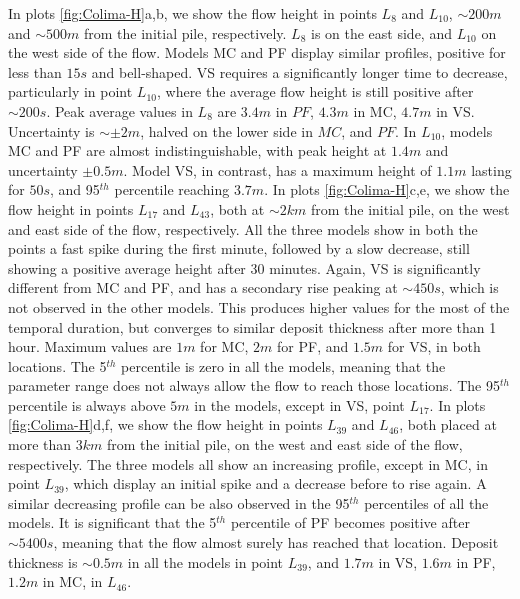 \documentclass{article}
\begin{document}
In plots \ref{fig:Colima-H}a,b, we show the flow height in points $L_8$ and $L_{10}$, $\sim 200 m$ and $\sim 500 m$ from the initial pile, respectively. $L_8$ is on the east side, and $L_{10}$ on the west side of the flow. Models MC and PF display similar profiles, positive for less than $15 s$ and bell-shaped. VS requires a significantly longer time to decrease, particularly in point $L_{10}$, where the average flow height is still positive after $\sim 200 s$. Peak average values in $L_8$ are $3.4 m$ in $PF$, $4.3 m$ in MC, $4.7 m$ in VS. Uncertainty is $\sim \pm 2 m$, halved on the lower side in $MC$, and $PF$. In $L_{10}$, models MC and PF are almost indistinguishable, with peak height at $1.4 m$ and uncertainty $\pm 0.5 m$. Model VS, in contrast, has a maximum height of $1.1 m$ lasting for $50s$, and 95$^{th}$ percentile reaching $3.7 m$. In plots \ref{fig:Colima-H}c,e, we show the flow height in points $L_{17}$ and $L_{43}$, both at $\sim 2 km$ from the initial pile, on the west and east side of the flow, respectively. All the three models show in both the points a fast spike during the first minute, followed by a slow decrease, still showing a positive average height after 30 minutes. Again, VS is significantly different from MC and PF, and has a secondary rise peaking at $\sim 450 s$, which is not observed in the other models. This produces higher values for the most of the temporal duration, but converges to similar deposit thickness after more than 1 hour. Maximum values are $1 m$ for MC, $2 m$ for PF, and $1.5 m$ for VS, in both locations. The 5$^{th}$ percentile is zero in all the models, meaning that the parameter range does not always allow the flow to reach those locations. The 95$^{th}$ percentile is always above $5m$ in the models, except in VS, point $L_{17}$. In plots \ref{fig:Colima-H}d,f, we show the flow height in points $L_{39}$ and $L_{46}$, both placed at more than $3 km$ from the initial pile, on the west and east side of the flow, respectively. The three models all show an increasing profile, except in MC, in point $L_{39}$, which display an initial spike and a decrease before to rise again. A similar decreasing profile can be also observed in the 95$^{th}$ percentiles of all the models. It is significant that the 5$^{th}$ percentile of PF becomes positive after $\sim 5400 s$, meaning that the flow almost surely has reached that location. Deposit thickness is $\sim 0.5 m$ in all the models in point $L_{39}$, and $1.7 m$ in VS, $1.6 m$ in PF, $1.2 m$ in MC, in $L_{46}$.
\end{document}
